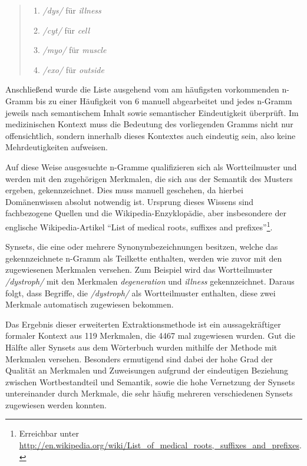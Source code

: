 \documentclass[pagesize,paper=A4,DIV=calc,fontsize=12pt,draft=false]{scrreprt}
\begin{document}
\begin{quote}
\begin{multicols}{2}
\begin{enumerate}
\item \emph{/dys/} für \emph{illness}
\item \emph{/cyt/} für \emph{cell}
\item \emph{/myo/} für \emph{muscle}
\item \emph{/exo/} für \emph{outside}
\end{enumerate}
\end{multicols}
\end{quote}

Anschließend wurde die Liste ausgehend vom am häufigsten vorkommenden n-Gramm bis zu einer Häufigkeit von 6 manuell abgearbeitet und jedes n-Gramm jeweils nach semantischem Inhalt sowie semantischer Eindeutigkeit überprüft.
Im medizinischen Kontext muss die Bedeutung des vorliegenden Gramms nicht nur offensichtlich, sondern innerhalb dieses Kontextes auch eindeutig sein, also keine Mehrdeutigkeiten aufweisen. 

Auf diese Weise ausgesuchte n-Gramme qualifizieren sich als Wortteilmuster und werden mit den zugehörigen Merkmalen, die sich aus der Semantik des Musters ergeben, gekennzeichnet. 
Dies muss manuell geschehen, da hierbei Domänenwissen absolut notwendig ist. 
Ursprung dieses Wissens sind fachbezogene Quellen und die Wikipedia-Enzyklopädie, aber insbesondere der englische Wikipedia-Artikel \enquote{List of medical roots, suffixes and prefixes}\footnote{Erreichbar unter \href{http://en.wikipedia.org/wiki/List\_of\_medical\_roots,\_suffixes\_and\_prefixes}{http://en.wikipedia.org/wiki/List\_of\_medical\_roots,\_suffixes\_and\_prefixes}.}. 

Synsets, die eine oder mehrere Synonymbezeichnungen besitzen, welche das gekennzeichnete n-Gramm als Teilkette enthalten, werden wie zuvor mit den zugewiesenen Merkmalen versehen. 
Zum Beispiel wird das Wortteilmuster \emph{/dystroph/} mit den Merkmalen \emph{degeneration} und \emph{illness} gekennzeichnet. 
Daraus folgt, dass Begriffe, die \emph{/dystroph/} als Wortteilmuster enthalten, diese zwei Merkmale automatisch zugewiesen bekommen. 

Das Ergebnis dieser erweiterten Extraktionsmethode ist ein aussagekräftiger formaler Kontext aus 119 Merkmalen, die 4467 mal zugewiesen wurden. 
Gut die Hälfte aller Synsets aus dem Wörterbuch wurden mithilfe der Methode mit Merkmalen versehen. 
Besonders ermutigend sind dabei der hohe Grad der Qualität an Merkmalen und Zuweisungen aufgrund der eindeutigen Beziehung zwischen Wortbestandteil und Semantik, sowie die hohe Vernetzung der Synsets untereinander durch Merkmale, die sehr häufig mehreren verschiedenen Synsets zugewiesen werden konnten. 
\end{document}
